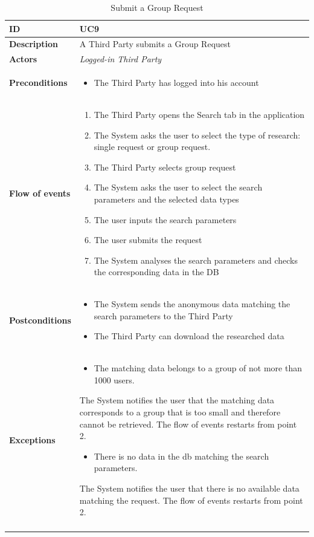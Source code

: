 \documentclass[titlepage]{article}
\begin{document}
\begin{longtable}{| p{3 cm} | p{10 cm} |} 
			\hline
			{\bf ID} & UC9 \\
			\hline
			{\bf Description} & A Third Party submits a Group Request \\
			\hline
			{\bf Actors} & {\it Logged-in Third Party }\\
			\hline
			{\bf Preconditions} & 		
							\begin{itemize}
								\item The Third Party has logged into his account
							\end{itemize}
			\\
			\hline
			{\bf Flow of events} & 
							\begin{enumerate}
								\item The Third Party opens the Search tab in the application
\item The System asks the user to select the type of research: single request or group request.
\item The Third Party selects group request
\item The System asks the user to select the search parameters and the selected data types
\item The user inputs the search parameters
\item The user submits the request
\item The System analyses the search parameters and checks the corresponding data in the DB
							\end{enumerate}
			
			 \\
			\hline
			{\bf Postconditions} & 
							\begin{itemize}
								\item The System sends the anonymous data matching the search parameters to the Third Party
\item The Third Party can download the researched data

							\end{itemize}
			\\
			\hline
			{\bf Exceptions} & 
							\begin{itemize}
								\item The matching data belongs to a group of not more than 1000 users.
							\end{itemize}
							The System notifies the user that the matching data corresponds to a group that is too small and therefore cannot be retrieved. The flow of events restarts from point 2.
							\begin{itemize}
								\item There is no data in the db matching the search parameters.
							\end{itemize}
							The System notifies the user that there is no available data matching the request. The flow of events restarts from point 2.
							
			\\
			\hline
			\caption{Submit a Group Request}
			\end{longtable}
\end{document}
